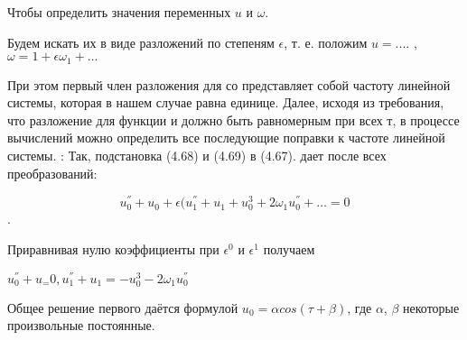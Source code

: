 \documentclass[bachelor, och, coursework, times]{SCWorks}
\begin{document}
Чтобы определить значения переменных $u$ и $\omega$.

Будем искать их в виде разложений по степеням $\epsilon$, т. е. положим
$ u = ....$ , $\omega=1+\epsilon \omega_1+\ldots$


При этом первый член разложения для со представляет собой 
частоту линейной системы, которая в нашем случае равна единице.
Далее, исходя из требования, что разложение для функции и
должно быть равномерным при всех т, в процессе вычислений
можно определить все последующие поправки к частоте линейной
системы.
:
Так, подстановка (4.68) и (4.69) в (4.67). дает после всех преобразований:

$$u_0^{''}+u_0+\epsilon(u_1^{''}+u_1+u_0^3+2\omega_1 u_0^{''}+\ldots=0$$.

Приравнивая нулю коэффициенты при $\epsilon^{0}$ и $\epsilon^{1}$ получаем

$u_0^{''}+u_=0, u_1^{''}+u_1=-u_0^3-2\omega_1u_0^{''}$

Общее решение первого даётся формулой $u_0=\alpha cos(\tau+\beta)$, где $\alpha$, $\beta$ некоторые произвольные постоянные.






\end{document}
